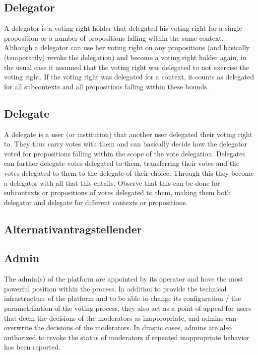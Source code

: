 \subsection{Delegator}
\label{ssec:Roles_Delegator}
A delegator is a voting right holder that delegated his voting right for a single proposition or a number of propositions falling within the same context. Although a delegator can use her voting right on any propositions (and basically (temporarily) revoke the delegation) and become a voting right holder again, in the usual case it assumed that the voting right was delegated to not exercise the voting right. If the voting right was delegated for a context, it counts as delegated for all subcontexts and all propositions falling within these bounds.  

\subsection{Delegate}
\label{ssec:Roles_Delegate}
A delegate is a user (or institution) that another user delegated their voting right to. They thus carry votes with them and can basically decide how the delegator voted for propositions falling within the scope of the vote delegation. Delegates can further delegate votes delegated to them, transferring their votes and the votes delegated to them to the delegate of their choice. Through this they become a delegator with all that this entails. Observe that this can be done for subcontexts or propositions of votes delegated to them, making them both delegator and delegate for different contexts or propositions.

\subsection{Alternativantragstellender}
%
%
\label{ssec:Roles_Alternativantragstellender}

\subsection{Admin}
\label{ssec:Roles_Admin}
The admin(s) of the platform are appointed by its operator and have the most powerful position within the process. In addition to provide the technical infrastructure of the platform and to be able to change its configuration / the parametrization of the voting process, they also act as a point of appeal for users that deem the decisions of the moderators as inappropriate, and admins can overwrite the decisions of the moderators. In drastic cases, admins are also authorized to revoke the status of moderators if repeated inappropriate behavior has been reported. 


